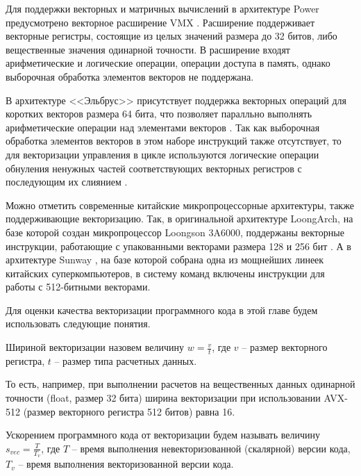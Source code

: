 Для поддержки векторных и матричных вычислений в архитектуре Power предусмотрено векторное расширение VMX \cite{Gschwind2016VecPower,Eisen2007VecPower}.
Расширение поддерживает векторные регистры, состоящие из целых значений размера до 32 битов, либо вещественные значения одинарной точности.
В расширение входят арифметические и логические операции, операции доступа в память, однако выборочная обработка элементов векторов не поддержана.

В архитектуре <<Эльбрус>> присутствует поддержка векторных операций для коротких векторов размера 64 бита, что позволяет паралльно выполнять арифметические операции над элементами векторов \cite{Ishin2011VecElbrus}.
Так как выборочная обработка элементов векторов в этом наборе инструкций также отсутствует, то для векторизации управления в цикле используются логические операции обнуления ненужных частей соответствующих векторных регистров с последующим их слиянием \cite{Volkonsky2012VecElbrus}.

Можно отметить современные китайские микропроцессорные архитектуры, также поддерживающие векторизацию.
Так, в оригинальной архитектуре LoongArch, на базе которой создан микропроцессор Loongson 3A6000, поддержаны векторные инструкции, работающие с упакованными векторами размера 128 и 256 бит \cite{Bai2024VecLoongarch}.
А в архитектуре Sunway \cite{Sun2023VecSunway}, на базе которой собрана одна из мощнейших линеек китайских суперкомпьютеров, в систему команд включены инструкции для работы с 512-битными векторами.

Для оценки качества векторизации программного кода в этой главе будем использовать следующие понятия.

\begin{definition}
Шириной векторизации назовем величину $w = \frac{v}{t}$, где $v$ -- размер векторного регистра, $t$ -- размер типа расчетных данных.
\end{definition}

То есть, например, при выполнении расчетов на вещественных данных одинарной точности (float, размер 32 бита) ширина векторизации при использовании AVX-512 (размер векторного регистра 512 битов) равна 16.

\begin{definition}
Ускорением программного кода от векторизации будем называть величину $s_{vec} = \frac{T}{T_v}$, где $T$ -- время выполнения невекторизованной (скалярной) версии кода, $T_v$ -- время выполнения векторизованной версии кода.
\end{definition}


